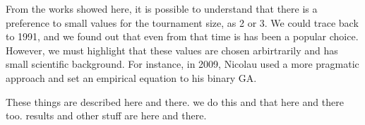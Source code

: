  From the works showed here, it is possible to understand that there is a preference to small values for the tournament size, as 2 or 3. We could trace back to 1991, and we found out that even from that time is has been a popular choice. However, we must highlight that these values are chosen arbirtrarily and has small scientific background. For instance, in 2009, Nicolau used a more pragmatic approach and set an empirical equation to his binary GA. 
 
 

These things are described here and there. we do this and that here and there too. results and other stuff are here and there.